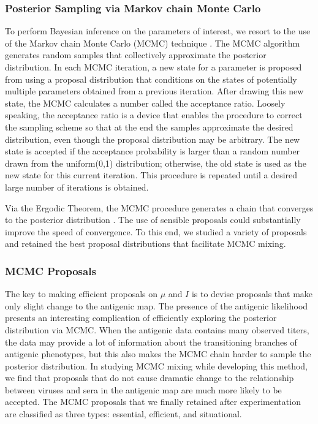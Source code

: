 \documentclass[11pt,oneside,letterpaper]{article}
\begin{document}


\subsubsection*{Posterior Sampling via Markov chain Monte Carlo}

To perform Bayesian inference on the parameters of interest, we resort to the use of the Markov chain Monte Carlo (MCMC) technique \cite{hastings_monte_1970, metropolis_equation_1953}.
The MCMC algorithm generates random samples that collectively approximate the posterior distribution.
In each MCMC iteration, a new state for a parameter is proposed from using a proposal distribution that conditions on the states of potentially multiple parameters obtained from a previous iteration.
After drawing this new state, the MCMC calculates a number called the acceptance ratio.
Loosely speaking, the acceptance ratio is a device that enables the procedure to correct the sampling scheme so that at the end the samples approximate the desired distribution, even though the proposal distribution may be arbitrary.
The new state is accepted if the acceptance probability is larger than a random number drawn from the uniform(0,1) distribution; otherwise, the old state is used as the new state for this current iteration.
This procedure is repeated until a desired large number of iterations is obtained.


Via the Ergodic Theorem, the MCMC procedure generates a chain that converges to the posterior distribution \cite{hastings_monte_1970}. %
The use of sensible proposals could substantially improve the speed of convergence.
To this end, we studied a variety of proposals and retained the best proposal distributions that facilitate MCMC mixing.


\subsubsection*{MCMC Proposals}

The key to making efficient proposals on $\mu$ and $I$ is to devise proposals that make only slight change to the antigenic map.
The presence of the antigenic likelihood presents an interesting complication of efficiently exploring the posterior distribution via MCMC.
When the antigenic data contains many observed titers, the data may provide a lot of information about the transitioning branches of antigenic phenotypes, but this also makes the MCMC chain harder to sample the posterior distribution.
In studying MCMC mixing while developing this method, we find that proposals that do not cause dramatic change to the relationship between viruses and sera in the antigenic map are much more likely to be accepted.
The MCMC proposals that we finally retained after experimentation are classified as three types: essential, efficient, and situational. 
\end{document}
